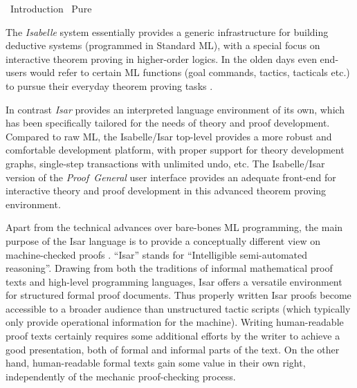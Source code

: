 %
\begin{isabellebody}%
\def\isabellecontext{Introduction}%
%
\isadelimtheory
\isanewline
\isanewline
%
\endisadelimtheory
%
\isatagtheory
{}\isamarkupfalse%
\ Introduction\isanewline
{}\ Pure\isanewline
{}%
\endisatagtheory
{\isafoldtheory}%
%
\isadelimtheory
%
\endisadelimtheory
%
\isamarkuptrue%
%
\isamarkuptrue%
%
\begin{isamarkuptext}%
The \emph{Isabelle} system essentially provides a generic
  infrastructure for building deductive systems (programmed in
  Standard ML), with a special focus on interactive theorem proving in
  higher-order logics.  In the olden days even end-users would refer
  to certain ML functions (goal commands, tactics, tacticals etc.) to
  pursue their everyday theorem proving tasks
  \cite{isabelle-intro,isabelle-ref}.
  
  In contrast \emph{Isar} provides an interpreted language environment
  of its own, which has been specifically tailored for the needs of
  theory and proof development.  Compared to raw ML, the Isabelle/Isar
  top-level provides a more robust and comfortable development
  platform, with proper support for theory development graphs,
  single-step transactions with unlimited undo, etc.  The
  Isabelle/Isar version of the \emph{Proof~General} user interface
  \cite{proofgeneral,Aspinall:TACAS:2000} provides an adequate
  front-end for interactive theory and proof development in this
  advanced theorem proving environment.

  \medskip Apart from the technical advances over bare-bones ML
  programming, the main purpose of the Isar language is to provide a
  conceptually different view on machine-checked proofs
  \cite{Wenzel:1999:TPHOL,Wenzel-PhD}.  ``Isar'' stands for
  ``Intelligible semi-automated reasoning''.  Drawing from both the
  traditions of informal mathematical proof texts and high-level
  programming languages, Isar offers a versatile environment for
  structured formal proof documents.  Thus properly written Isar
  proofs become accessible to a broader audience than unstructured
  tactic scripts (which typically only provide operational information
  for the machine).  Writing human-readable proof texts certainly
  requires some additional efforts by the writer to achieve a good
  presentation, both of formal and informal parts of the text.  On the
  other hand, human-readable formal texts gain some value in their own
  right, independently of the mechanic proof-checking process.


\end{isamarkuptext}
\end{isabellebody}
